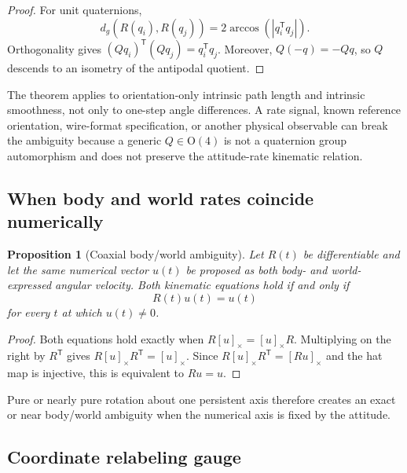 \documentclass[11pt]{article}
\newtheorem{proposition}[theorem]{Proposition}
\newcommand{\OO}{\mathrm{O}}
\newcommand{\T}{\mathsf{T}}
\newcommand{\abs}[1]{\left\lvert #1 \right\rvert}
\begin{document}
    \begin{proof}
        For unit quaternions,
        \begin{equation}
            d_g(R(q_i),R(q_j))
            =2\arccos\!\left(\abs{q_i^{\T} q_j}\right).
        \end{equation}
        Orthogonality gives
        $(Qq_i)^{\T}(Qq_j)=q_i^{\T}q_j$. Moreover, $Q(-q)=-Qq$, so $Q$ descends to an
        isometry of the antipodal quotient.
    \end{proof}

    The theorem applies to orientation-only intrinsic path length and intrinsic smoothness,
    not only to one-step angle differences. A rate signal, known reference orientation,
    wire-format specification, or another physical observable can break the ambiguity
    because a generic $Q\in\OO(4)$ is not a quaternion group automorphism and does not
    preserve the attitude-rate kinematic relation.

    \subsection{When body and world rates coincide numerically}

    \begin{proposition}[Coaxial body/world ambiguity]
Let $R(t)$ be differentiable and let the same numerical vector $u(t)$ be proposed as
both body- and world-expressed angular velocity. Both kinematic equations hold if and
only if
\begin{equation}
    R(t)u(t)=u(t)
\end{equation}
for every $t$ at which $u(t)\ne0$.
    \end{proposition}

    \begin{proof}
        Both equations hold exactly when
        $R[u]_\times=[u]_\times R$. Multiplying on the right by $R^{\T}$ gives
        $R[u]_\times R^{\T}=[u]_\times$. Since
        $R[u]_\times R^{\T}=[Ru]_\times$ and the hat map is injective, this is equivalent to
        $Ru=u$.
    \end{proof}

    Pure or nearly pure rotation about one persistent axis therefore creates an exact or
    near body/world ambiguity when the numerical axis is fixed by the attitude.

    \subsection{Coordinate relabeling gauge}
\end{document}
